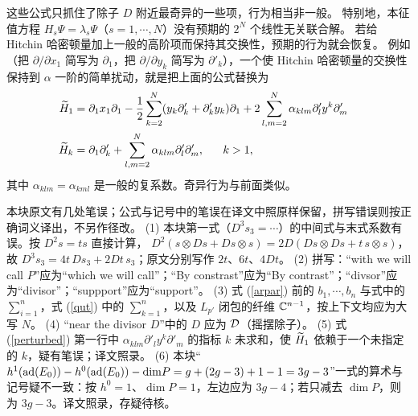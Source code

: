 这些公式只抓住了除子 $D$ 附近最奇异的一些项，行为相当非一般。
特别地，本征值方程 $H_s\Psi=\lambda_s\Psi$（$s=1,\cdots, N$）没有预期的 $2^N$ 个线性无关联合解。
若给 Hitchin 哈密顿量加上一般的高阶项而保持其交换性，预期的行为就会恢复。
例如（把 $\partial/\partial x_1$ 简写为 $\partial_1$，把 $\partial/\partial y_k$ 简写为 $\partial'_k$），一个使 Hitchin
哈密顿量的交换性保持到 $\alpha$ 一阶的简单扰动，就是把上面的公式替换为
\begin{align}\label{perturbed} \widetilde H_1& = \partial_1 x_1\partial_1 -\frac{1}{2}\sum_{k=2}^N(y_k \partial'_k+\partial'_k y_k)\partial_1
+2 \sum_{l,m=2}^N \alpha_{klm}\partial'_l y^k \partial'_m \cr
\widetilde H_k&= \partial_1\partial'_k +\sum_{l,m=2}^N \alpha_{klm}\partial'_l\partial'_m,~~~~~k>1, \end{align}  
其中 $\alpha_{klm}=\alpha_{kml}$ 是一般的复系数。奇异行为与前面类似。

\begin{yizhu}
本块原文有几处笔误；公式与记号中的笔误在译文中照原样保留，拼写错误则按正确词义译出，不另作径改。
(1) 本块第一式（$D^3s_3=\cdots$）的中间式与末式系数有误。按 $D^2s=ts$ 直接计算，
$D^2(s\otimes Ds+Ds\otimes s)=2D(Ds\otimes Ds+t\,s\otimes s)$，
故 $D^3s_3=4t\,Ds_3+2Dt\,s_3$；原文分别写作 $2t$、$6t$、$4Dt$。
(2) 拼写：“with we will call $P$”应为“which we will call”；“By constrast”应为“By contrast”；“divsor”应为“divisor”；“suppport”应为“support”。
(3) 式 (\ref{arpar}) 前的 $b_1,\cdots, b_n$ 与式中的 $\sum_{i=1}^n$，式 (\ref{qut}) 中的 $\sum_{k=1}^n$，以及 $L_{p'}$ 闭包的纤维 ${\mathbb C}^{n-1}$，按上下文均应为大写 $N$。
(4) “near the divisor $D$”中的 $D$ 应为 ${\mathcal D}$（摇摆除子）。
(5) 式 (\ref{perturbed}) 第一行中 $\alpha_{klm}\partial'_l y^k\partial'_m$ 的指标 $k$ 未求和，使 $\widetilde H_1$ 依赖于一个未指定的 $k$，疑有笔误；译文照录。
(6) 本块“$h^1({\mathrm{ad}}(E_0))-h^0({\mathrm{ad}}(E_0))-{\mathrm{dim}} P=g+(2g-3)+1-1=3g-3$”一式的算术与记号疑不一致：按 $h^0=1$、$\dim P=1$，左边应为 $3g-4$；若只减去 $\dim P$，则为 $3g-3$。译文照录，存疑待核。
\end{yizhu}
